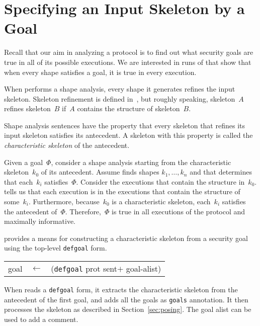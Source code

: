 \documentclass[12pt]{article}
\newcommand{\sym}[1]{\textup{\texttt{#1}}}
\begin{document}
\section{Specifying an Input Skeleton by a Goal}\label{sec:specifying}

Recall that our aim in analyzing a protocol is to find out what
security goals are true in all of its possible executions.  We are
interested in runs of {\cpsa} that show that when every shape
satisfies a goal, it is true in every execution.

When {\cpsa} performs a shape analysis, every shape it generates
refines the input skeleton.  Skeleton refinement is defined
in~\cite[Section~6]{cpsaprimer09}, but roughly speaking, skeleton~$A$
refines skeleton~$B$ if~$A$ contains the structure of skeleton~$B$.

Shape analysis sentences have the property that every skeleton that
refines its input skeleton satisfies its antecedent.  A skeleton with
this property is called the \emph{characteristic skeleton} of the
antecedent.

Given a goal~\(\Phi\), consider a shape analysis starting from the
characteristic skeleton~$k_0$ of its antecedent.  Assume {\cpsa} finds
shapes $k_1,\ldots,k_n$ and that {\cpsa} determines that each~$k_i$
satisfies~$\Phi$.  Consider the executions that contain the structure
in~$k_0$.  {\cpsa} tells us that each execution is in the executions
that contain the structure of some~$k_i$.  Furthermore, because~$k_0$
is a characteristic skeleton, each~$k_i$ satisfies the antecedent
of~$\Phi$.  Therefore,~$\Phi$ is true in all executions of the
protocol and maximally informative.

{\cpsa} provides a means for constructing a characteristic skeleton
from a security goal using the top-level \texttt{defgoal} form.

\begin{center}\scshape
  \begin{tabular}{rcl}
  goal&$\leftarrow$&(\sym{defgoal} prot sent$+$ goal-alist)
  \end{tabular}
\end{center}

When {\cpsa} reads a \texttt{defgoal} form, it extracts the
characteristic skeleton from the antecedent of the first goal, and
adds all the goals as \texttt{goals} annotation.  It then processes
the skeleton as described in Section~\ref{sec:posing}.  The goal alist
can be used to add a comment.
\end{document}
